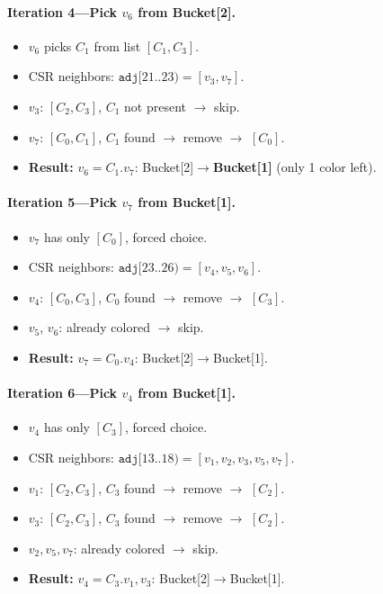 \documentclass[11pt,letterpaper]{article}
\begin{document}
\paragraph{Iteration 4---Pick $v_6$ from Bucket[2].}
\begin{itemize}[nosep]
  \item $v_6$ picks $C_1$ from list $[C_1, C_3]$.
  \item CSR neighbors: $\texttt{adj}[21..23) = [v_3, v_7]$.
  \item $v_3$: $[C_2,C_3]$, $C_1$ not present $\rightarrow$ skip.
  \item $v_7$: $[C_0,C_1]$, $C_1$ found $\rightarrow$ remove $\rightarrow$ $[C_0]$.
  \item \textbf{Result:} $v_6 = C_1$.\quad $v_7$: Bucket[2]$\to$\textbf{Bucket[1]} (only 1 color left).
\end{itemize}

\paragraph{Iteration 5---Pick $v_7$ from Bucket[1].}
\begin{itemize}[nosep]
  \item $v_7$ has only $[C_0]$, forced choice.
  \item CSR neighbors: $\texttt{adj}[23..26) = [v_4, v_5, v_6]$.
  \item $v_4$: $[C_0,C_3]$, $C_0$ found $\rightarrow$ remove $\rightarrow$ $[C_3]$.
  \item $v_5$, $v_6$: already colored $\rightarrow$ skip.
  \item \textbf{Result:} $v_7 = C_0$.\quad $v_4$: Bucket[2]$\to$Bucket[1].
\end{itemize}

\paragraph{Iteration 6---Pick $v_4$ from Bucket[1].}
\begin{itemize}[nosep]
  \item $v_4$ has only $[C_3]$, forced choice.
  \item CSR neighbors: $\texttt{adj}[13..18) = [v_1, v_2, v_3, v_5, v_7]$.
  \item $v_1$: $[C_2,C_3]$, $C_3$ found $\rightarrow$ remove $\rightarrow$ $[C_2]$.
  \item $v_3$: $[C_2,C_3]$, $C_3$ found $\rightarrow$ remove $\rightarrow$ $[C_2]$.
  \item $v_2, v_5, v_7$: already colored $\rightarrow$ skip.
  \item \textbf{Result:} $v_4 = C_3$.\quad $v_1,v_3$: Bucket[2]$\to$Bucket[1].
\end{itemize}
\end{document}
